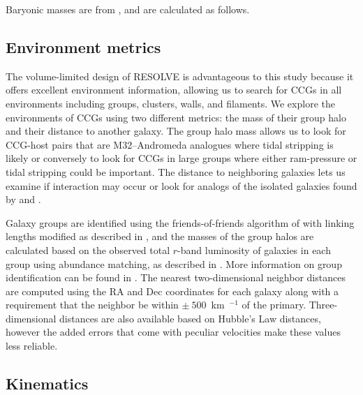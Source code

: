 \documentclass[iop,apj]{emulateapj}
\begin{document}
Baryonic masses are from \citet{Eckert2016}, and are calculated as follows. 


\subsection{Environment metrics}
\label{env}
The volume-limited design of RESOLVE is advantageous to this study because it offers excellent environment information, allowing us to search for CCGs in all environments including groups, clusters, walls, and filaments. We explore the environments of CCGs using two different metrics: the mass of their group halo and their distance to another galaxy. The group halo mass allows us to look for CCG-host pairs that are M32--Andromeda analogues where tidal stripping is likely or conversely to look for CCGs in large groups where either ram-pressure or tidal stripping could be important. The distance to neighboring galaxies lets us examine if interaction may occur or look for analogs of the isolated galaxies found by \citet{Huxor2013} and \citet{Paudel2014}.

Galaxy groups are identified using the friends-of-friends algorithm of \citet{Berlind2006} with linking lengths modified as described in \citet{Eckert2016}, and the masses of the group halos are calculated based on the observed total $r$-band luminosity of galaxies in each group using abundance matching, as described in \citet{Blanton2007}. More information on group identification can be found in \citet{Eckert2016}. The nearest two-dimensional neighbor distances are computed using the RA and Dec coordinates for each galaxy along with a requirement that the neighbor be within $\pm~500$~km~$^{-1}$ of the primary. Three-dimensional distances are also available based on Hubble's Law distances, however the added errors that come with peculiar velocities make these values less reliable.

\subsection{Kinematics}
\label{kindata}
\end{document}
